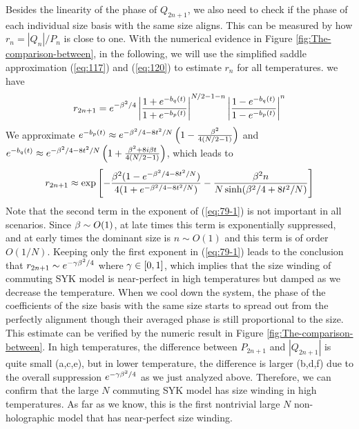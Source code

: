 \documentclass[11pt]{article}
\renewcommand{\>}{\rangle}
\newcommand{\<}{\langle}
\begin{document}
Besides the linearity of the phase of $Q_{2n+1}$, we also need to
check if the phase of each individual size basis with the same size
aligns. This can be measured by how $r_{n}=|Q_{n}|/P_{n}$ is close
to one. With the numerical evidence in Figure \ref{fig:The-comparison-between},
in the following, we will use the simplified saddle approximation (\ref{eq:117})
and (\ref{eq:120}) to estimate $r_{n}$ for all temperatures. we
have
\begin{equation}
r_{2n+1}=e^{-\beta^{2}/4}\left|\frac{1+e^{-b_{q}(t)}}{1+e^{-b_{p}(t)}}\right|^{N/2-1-n}\left|\frac{1-e^{-b_{q}(t)}}{1-e^{-b_{p}(t)}}\right|^{n}
\end{equation}
We approximate $e^{-b_{p}(t)}\approx e^{-\beta^{2}/4-8t^{2}/N}\left(1-\frac{\beta^{2}}{4(N/2-1)}\right)$
and $e^{-b_{q}(t)}\approx e^{-\beta^{2}/4-8t^{2}/N}\left(1+\frac{\beta^{2}+8i\beta t}{4(N/2-1)}\right)$,
which leads to
\begin{equation}
r_{2n+1}\approx\exp\left[-\frac{\beta^{2}(1-e^{-\beta^{2}/4-8t^{2}/N})}{4(1+e^{-\beta^{2}/4-8t^{2}/N})}-\frac{\beta^{2}n}{N\sinh(\beta^{2}/4+8t^{2}/N)}\right]\label{eq:79-1}
\end{equation}
Note that the second term in the exponent of (\ref{eq:79-1}) is not
important in all scenarios. Since $\beta\sim O(1)$, at late times this term is exponentially suppressed, and at early
times the dominant size is $n\sim O(1)$ and this term is of order
$O(1/N)$. Keeping only the first exponent in (\ref{eq:79-1}) leads
to the conclusion that $r_{2n+1}\sim e^{-\gamma\beta^{2}/4}$ where
$\gamma\in[0,1]$, which implies that the size winding of commuting SYK
model is near-perfect in high temperatures but damped as we decrease the temperature.
When we cool down the system, the phase of the coefficients of the
size basis with the same size starts to spread out from the perfectly
alignment though their averaged phase is still proportional to the
size. This estimate can be verified by the numeric result in Figure
\ref{fig:The-comparison-between}. In high temperatures, the difference
between $P_{2n+1}$ and $|Q_{2n+1}|$ is quite small (a,c,e), but in lower temperature,
the difference is larger (b,d,f) due to the overall suppression $e^{-\gamma\beta^{2}/4}$
as we just analyzed above. Therefore, we can confirm that the large
$N$ commuting SYK model has size winding in high temperatures. As
far as we know, this is the first nontrivial large $N$ non-holographic model that has near-perfect size winding.
\end{document}

